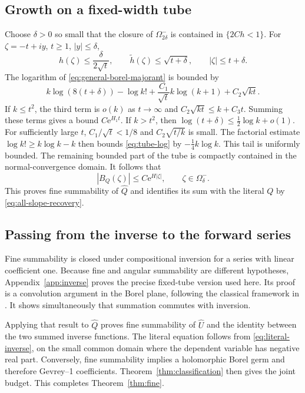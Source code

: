 \documentclass[11pt,a4paper]{article}
\numberwithin{equation}{section}
\theoremstyle{definition}
\theoremstyle{remark}
\theoremstyle{definition}
\newcommand{\U}{\widehat U}
\newcommand{\Q}{\widehat Q}
\newcommand{\e}{\mathrm e}
\begin{document}
\subsection{Growth on a fixed-width tube}
Choose $\delta>0$ so small that the closure of $\Omega^-_{2\delta}$ is
contained in $\{2Ch<1\}$. For $\zeta=-t+iy$, $t\ge1$, $|y|\le\delta$,
\[
 h(\zeta)\le\frac{\delta}{2\sqrt t},\qquad
 \widetilde h(\zeta)\le\sqrt{t+\delta},\qquad
 |\zeta|\le t+\delta.
\]
The logarithm of \eqref{eq:general-borel-majorant} is bounded by
\begin{equation}
 k\log(8(t+\delta))-\log k!
       +\frac{C_1}{\sqrt t}k\log(k+1)+C_2\sqrt{kt}.
 \label{eq:tube-log}
\end{equation}
If $k\le t^2$, the third term is $o(k)$ as $t\to\infty$ and
$C_2\sqrt{kt}\le k+C_3t$. Summing these terms gives a bound
$C\e^{H_1t}$. If $k>t^2$, then
$\log(t+\delta)\le\tfrac12\log k+o(1)$. For sufficiently large $t$,
$C_1/\sqrt t<1/8$ and $C_2\sqrt{t/k}$ is small. The factorial estimate
$\log k!\ge k\log k-k$ then bounds \eqref{eq:tube-log} by
$-\tfrac14 k\log k$. This tail is uniformly bounded.
The remaining bounded part of the tube is compactly contained in the
normal-convergence domain. It follows that
\begin{equation}
 |B_Q(\zeta)|\le C\e^{H|\zeta|},\qquad\zeta\in\Omega^-_\delta.
 \label{eq:weighted-fine-bound}
\end{equation}
This proves fine summability of $\Q$ and identifies its sum with the
literal $Q$ by \eqref{eq:all-slope-recovery}.

\subsection{Passing from the inverse to the forward series}
Fine summability is closed under compositional inversion for a series
with linear coefficient one. Because fine and angular summability are
different hypotheses, Appendix~\ref{app:inverse} proves the precise
fixed-tube version used here. Its proof is a convolution argument in
the Borel plane, following the classical framework in \cite{sauzin}.
It shows simultaneously that summation commutes with inversion.

Applying that result to $\Q$ proves fine summability of $\U$ and the
identity between the two summed inverse functions. The literal equation
follows from \eqref{eq:literal-inverse}, on the small common domain where
the dependent variable has negative real part. Conversely, fine
summability implies a holomorphic Borel germ and therefore Gevrey--1
coefficients. Theorem~\ref{thm:classification} then gives the joint
budget. This completes Theorem~\ref{thm:fine}.
\end{document}
